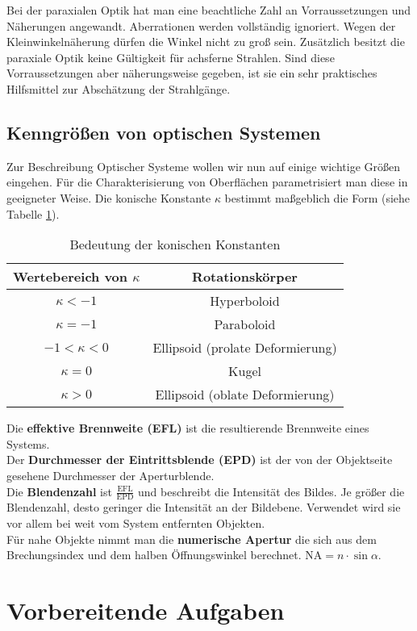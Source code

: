 \documentclass[twoside,colorback,accentcolor=tud4c,11pt]{tudreport}
\begin{document}
		Bei der paraxialen Optik hat man eine beachtliche Zahl an Vorraussetzungen und Näherungen angewandt. Aberrationen werden vollständig ignoriert. Wegen der Kleinwinkelnäherung dürfen die Winkel nicht zu groß sein. Zusätzlich besitzt die paraxiale Optik keine Gültigkeit für achsferne Strahlen. Sind diese Vorraussetzungen aber näherungsweise gegeben, ist sie ein sehr praktisches Hilfsmittel zur Abschätzung der Strahlgänge.
\section{Kenngrößen von optischen Systemen}
Zur Beschreibung Optischer Systeme wollen wir nun auf einige wichtige Größen eingehen. Für die Charakterisierung von Oberflächen parametrisiert man diese in geeigneter Weise. Die konische Konstante $ \kappa $ bestimmt maßgeblich die Form (siehe Tabelle \ref{tab:kappa}).
\begin{table}[H]
\centering
\begin{tabular}{|c|c|}
\hline 
Wertebereich von $ \kappa $ & Rotationskörper \\ 
\hline 
$ \kappa <-1 $ & Hyperboloid \\  
$ \kappa =-1 $ & Paraboloid \\ 
$-1< \kappa <0 $ & Ellipsoid (prolate Deformierung) \\ 
$ \kappa =0 $ & Kugel \\ 
$ \kappa >0 $ & Ellipsoid (oblate Deformierung) \\ 
\hline 
\end{tabular} 
\caption{Bedeutung der konischen Konstanten \cite{anl}}\label{tab:kappa}
\end{table}
Die \textbf{effektive Brennweite (EFL)} ist die resultierende Brennweite eines Systems. \\
Der \textbf{Durchmesser der Eintrittsblende (EPD)} ist der von der Objektseite gesehene Durchmesser der Aperturblende. \\
Die \textbf{Blendenzahl} ist $ \frac{\text{EFL}}{\text{EPD}} $ und beschreibt die Intensität des Bildes. Je größer die Blendenzahl, desto geringer die Intensität an der Bildebene. Verwendet wird sie vor allem bei weit vom System entfernten Objekten. \\
Für nahe Objekte nimmt man die \textbf{numerische Apertur} die sich aus dem Brechungsindex und dem halben Öffnungswinkel berechnet. NA$ =n\cdot\sin\alpha $.\\
\chapter{Vorbereitende Aufgaben}
\end{document}
